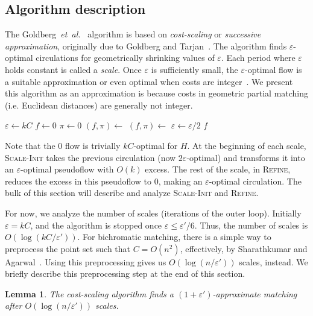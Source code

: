 \documentclass[11pt]{article}
\def\etal{\textsl{et~al.}}
\def\eps{\varepsilon}
\theoremstyle{plain}
\newtheorem{lemma}{Lemma}
\begin{document}
\begin{figure*}
\subsection{Algorithm description}

The Goldberg~{\etal}~\cite{GHKT17} algorithm is based on \emph{cost-scaling} or
\emph{successive approximation}, originally due to Goldberg and
Tarjan~\cite{GT90}.
The algorithm finds $\eps$-optimal circulations for geometrically shrinking
values of $\eps$.
Each period where $\eps$ holds constant is called a \emph{scale}.
Once $\eps$ is sufficiently small, the $\eps$-optimal flow is a suitable
approximation or even optimal when costs are integer~\cite{GT90,GHKT17}.
We present this algorithm as an approximation is because costs in geometric
partial matching (i.e. Euclidean distances) are generally not integer.

\begin{algorithm}
\caption{Cost-Scaling MCF}
\begin{algorithmic}[1]
\Function{MCF}{$H$, $\eps'$}
	\State $\eps \gets kC$
	\State $f \gets 0$
	\State $\pi \gets 0$
	\Repeat
		\State $(f, \pi) \gets$ 
		\State $(f, \pi) \gets$ 
		\State $\eps \gets \eps/2$
	\Until{$\eps \leq \eps'/6$}
	\State\Return $f$
\EndFunction
\end{algorithmic}
\end{algorithm}

Note that the 0 flow is trivially $kC$-optimal for $H$.
At the beginning of each scale, \textsc{Scale-Init} takes the previous
circulation (now $2\eps$-optimal) and transforms it into an $\eps$-optimal
pseudoflow with $O(k)$ excess.
The rest of the scale, in \textsc{Refine}, reduces the excess in this
pseudoflow to 0, making an $\eps$-optimal circulation.
The bulk of this section will describe and analyze \textsc{Scale-Init} and
\textsc{Refine}.

For now, we analyze the number of scales (iterations of the outer loop).
Initially $\eps = kC$, and the algorithm is stopped once $\eps \leq \eps'/6$.
Thus, the number of scales is $O(\log(kC/\eps'))$.
For bichromatic matching, there is a simple way to preprocess the point set
such that $C = O(n^2)$, effectively, by Sharathkumar and Agarwal~\cite{SA12}.
Using this preprocessing gives us $O(\log(n/\eps'))$ scales, instead.
We briefly describe this preprocessing step at the end of this section.

\begin{lemma}
\label{lemma:goldberg_scales}
The cost-scaling algorithm finds a $(1 + \eps')$-approximate matching after
$O(\log(n/\eps'))$ scales.
\end{lemma}


\end{figure*}
\end{document}
